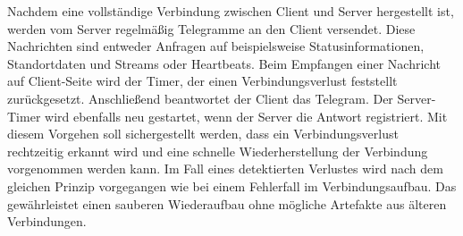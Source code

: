 \documentclass[thesis.tex]{subfiles}
\begin{document}
Nachdem eine vollständige Verbindung zwischen Client und Server hergestellt ist, werden vom Server regelmäßig Telegramme an den Client versendet.
Diese Nachrichten sind entweder Anfragen auf beispielsweise Statusinformationen, Standortdaten und Streams oder Heartbeats.
Beim Empfangen einer Nachricht auf Client-Seite wird der Timer, der einen Verbindungsverlust feststellt zurückgesetzt.
Anschließend beantwortet der Client das Telegram.
Der Server-Timer wird ebenfalls neu gestartet, wenn der Server die Antwort registriert.
Mit diesem Vorgehen soll sichergestellt werden, dass ein Verbindungsverlust rechtzeitig erkannt wird und eine schnelle Wiederherstellung der Verbindung vorgenommen werden kann.
Im Fall eines detektierten Verlustes wird nach dem gleichen Prinzip vorgegangen wie bei einem Fehlerfall im Verbindungsaufbau.
Das gewährleistet einen sauberen Wiederaufbau ohne mögliche Artefakte aus älteren Verbindungen.
\end{document}
